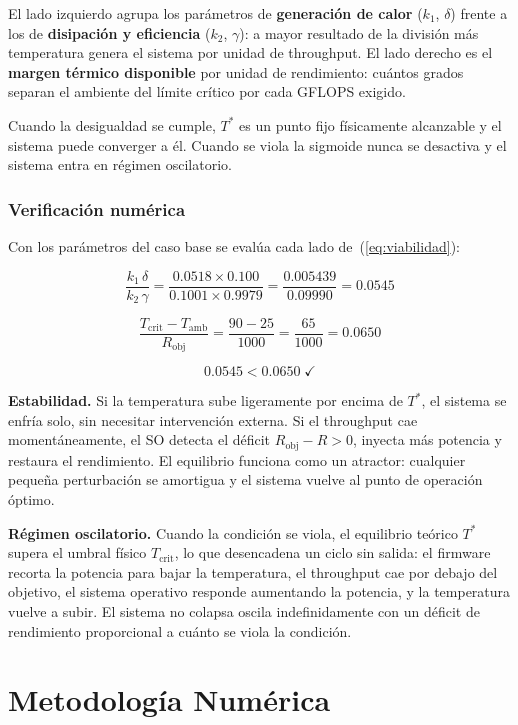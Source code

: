\documentclass[10pt, twocolumn]{article}
\begin{document}
El lado izquierdo agrupa los parámetros de \textbf{generación de calor}
($k_1$, $\delta$) frente a los de \textbf{disipación y eficiencia}
($k_2$, $\gamma$): a mayor resultado de la división más temperatura genera el
sistema por unidad de throughput. El lado derecho es el \textbf{margen
térmico disponible} por unidad de rendimiento: cuántos grados
separan el ambiente del límite crítico por cada GFLOPS exigido.

Cuando la desigualdad se cumple, $T^*$ es un punto fijo físicamente
alcanzable y el sistema puede converger a él. Cuando se viola la sigmoide nunca se desactiva y el
sistema entra en régimen oscilatorio.

\subsubsection*{Verificación numérica}

Con los parámetros del caso base se evalúa cada lado de~(\ref{eq:viabilidad}):

\[
  \frac{k_1\,\delta}{k_2\,\gamma}
  = \frac{0.0518 \times 0.100}{0.1001 \times 0.9979}
  = \frac{0.005439}{0.09990}
  = 0.0545
\]

\[
  \frac{T_{\text{crit}} - T_{\text{amb}}}{R_{\text{obj}}}
  = \frac{90 - 25}{1000}
  = \frac{65}{1000}
  = 0.0650
\]

\[
  0.0545 < 0.0650 \;\checkmark
\]

\noindent\textbf{Estabilidad.}
Si la temperatura sube ligeramente por encima de $T^*$, el sistema se enfría
solo, sin necesitar intervención externa. Si el throughput cae
momentáneamente, el SO detecta el déficit $R_\text{obj}-R>0$, inyecta más
potencia y restaura el rendimiento. El equilibrio funciona como un atractor: cualquier pequeña perturbación se amortigua y el sistema vuelve al punto de operación óptimo.

\noindent\textbf{Régimen oscilatorio.}
Cuando la condición se viola, el equilibrio teórico $T^*$ supera el umbral físico
$T_\text{crit}$, lo que desencadena un ciclo sin salida: el firmware recorta la
potencia para bajar la temperatura, el throughput cae por debajo del objetivo,
el sistema operativo responde aumentando la potencia, y la temperatura vuelve a subir.
El sistema no colapsa oscila indefinidamente
con un déficit de rendimiento proporcional a cuánto se viola la condición.

\section{Metodología Numérica}
\label{sec:numerica}
\end{document}
